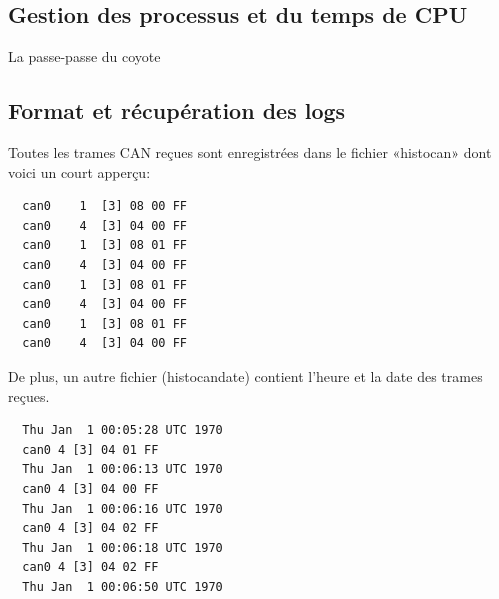 \documentclass[10pt,a4paper,final]{article}
\begin{document}
\begin{spacing}{1.5}
\subsection{Gestion des processus et du temps de CPU}
La passe-passe du coyote

\subsection{Format et récupération des logs}

Toutes les trames CAN reçues sont enregistrées dans le fichier «histocan» dont voici un court apperçu:
\end{spacing}
\begin{verbatim}
  can0    1  [3] 08 00 FF
  can0    4  [3] 04 00 FF
  can0    1  [3] 08 01 FF
  can0    4  [3] 04 00 FF
  can0    1  [3] 08 01 FF
  can0    4  [3] 04 00 FF
  can0    1  [3] 08 01 FF
  can0    4  [3] 04 00 FF
\end{verbatim}

De plus, un autre fichier (histocandate) contient l'heure et la date des trames reçues.
\begin{verbatim}
  Thu Jan  1 00:05:28 UTC 1970
  can0 4 [3] 04 01 FF
  Thu Jan  1 00:06:13 UTC 1970
  can0 4 [3] 04 00 FF
  Thu Jan  1 00:06:16 UTC 1970
  can0 4 [3] 04 02 FF
  Thu Jan  1 00:06:18 UTC 1970
  can0 4 [3] 04 02 FF
  Thu Jan  1 00:06:50 UTC 1970
\end{verbatim} 
\end{document}
